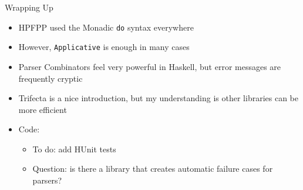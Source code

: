 \documentclass[hyperref={pdfpagelabels=false},12pt]{beamer}
\newcommand{\haskell}[1]{\texttt{#1}}
\newcommand{\unnamedUrl}[1]{\href{#1}{\color{blue}{#1}}}
\begin{document}
\begin{frame}{Wrapping Up}
  \begin{itemize}
    \item HPFPP used the Monadic \haskell{do} syntax everywhere
    \item However, \haskell{Applicative} is enough in many cases
    \item Parser Combinators feel very powerful in Haskell, but error messages are frequently cryptic
    \item Trifecta is a nice introduction, but my understanding is other libraries can be more efficient
    \item Code: \unnamedUrl{https://github.com/barrymoo/parser-combinators-haskell-trifecta-intro}
    \begin{itemize}
        \item To do: add HUnit tests
        \item Question: is there a library that creates automatic failure cases for parsers?
    \end{itemize}
  \end{itemize}
\end{frame}
\end{document}
